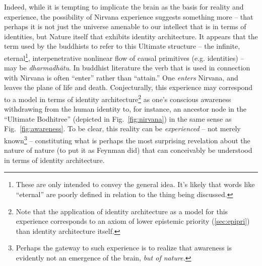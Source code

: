 \documentclass[pra,twocolumn,groupedaddress,10pt]{revtex4}
\theoremstyle{definition}
\begin{document}
Indeed, while it is tempting to implicate the brain as the basis for reality and experience, the possibility of Nirvana experience suggests something more -- that perhaps it is not just the universe amenable to our intellect that is in terms of identities, but Nature itself that exhibits identity architecture. It appears that the term used by the buddhists to refer to this Ultimate structure -- the infinite, eternal\footnote{These are only intended to convey the general idea. It's likely that words like ``eternal'' are poorly defined in relation to the thing being discussed.}, interpenetrative nonlinear flow of causal primitives (e.g. identities) -- may be \emph{dharmadh\={a}tu}\cite{dharmadhatu}. In buddhist literature the verb that is used in connection with Nirvana is often ``enter'' rather than ``attain.'' One \textit{enters} Nirvana, and leaves the plane of life and death. Conjecturally, this experience may correspond to a model in terms of identity architecture\footnote{Note that the application of identity architecture as a model for this experience corresponds to an axiom of lower epistemic priority (\autoref{sec:epipri}) than identity architecture itself.} as one's conscious awareness withdrawing from the human identity to, for instance, an ancestor node in the ``Ultimate Bodhitree'' (depicted in Fig.~\ref{fig:nirvana}) in the same sense as Fig.~\ref{fig:awareness}. To be clear, this reality can be \textit{experienced} -- not merely known\footnote{Perhaps the gateway to such experience is to realize that awareness is evidently not an emergence of the brain, \textit{but of nature.}} -- constituting what is perhaps the most surprising revelation about the nature of nature (to put it as Feynman did) that can conceivably be understood in terms of identity architecture.
\end{document}
